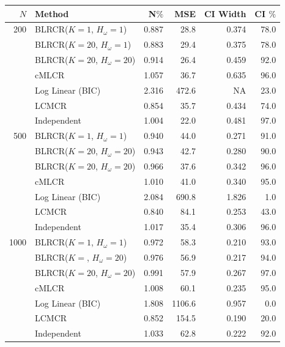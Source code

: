 \documentclass[
  12pt,
]{article}
\begin{document}
\begin{table}[H]
\centering
\begin{tabular}{||r l r r r r||} 
 \hline
$N$ & Method & N$\%$ &MSE & CI Width & CI $\%$   \\ [0.5ex] 
 \hline\hline
 200    & BLRCR($K=1$, $H_\omega=1$)  & 0.887   & 28.8   & 0.374   & 78.0 \\ 
               & BLRCR($K=20$, $H_\omega=1$)    & 0.883     & 29.4     & 0.375     & 78.0 \\ 
               & BLRCR($K=20$, $H_\omega=20$)    & 0.914     & 26.4     & 0.459     & 92.0 \\  
               & cMLCR       & 1.057       & 36.7      & 0.635      & 96.0 \\
               & Log Linear (BIC)  & 2.316      & 472.6     & NA     & 23.0 \\ 
               & LCMCR       & 0.854       & 35.7      & 0.434      & 74.0 \\ 
               & Independent & 1.004 & 22.0& 0.481& 97.0 \\ 

\hline
500    & BLRCR($K=1$, $H_\omega=1$)  & 0.940   & 44.0   & 0.271   & 91.0 \\ 
               & BLRCR($K=20$, $H_\omega=20$)    & 0.943     & 42.7     & 0.280     & 90.0 \\ 
               & BLRCR($K=20$, $H_\omega=20$)    & 0.966     & 37.6     & 0.342     & 96.0 \\  
               & cMLCR       & 1.010       & 41.0      & 0.340      & 95.0 \\
               & Log Linear (BIC)  & 2.084      & 690.8     & 1.826     & 1.0 \\ 
               & LCMCR       & 0.840       & 84.1      & 0.253      & 43.0 \\ 
               & Independent & 1.017 & 35.4& 0.306& 96.0 \\ 



\hline
1000    & BLRCR($K=1$, $H_\omega=1$)  & 0.972   & 58.3   & 0.210   & 93.0 \\ 
               & BLRCR($K=$, $H_\omega=20$)    & 0.976     & 56.9     & 0.217     & 94.0 \\ 
               & BLRCR($K=20$, $H_\omega=20$)    & 0.991     & 57.9     & 0.267     & 97.0 \\  
               & cMLCR       & 1.008       & 60.1      & 0.235      & 95.0 \\
               & Log Linear (BIC)  & 1.808      & 1106.6     & 0.957     & 0.0 \\ 
               & LCMCR       & 0.852       & 154.5      & 0.190      & 20.0 \\ 
               & Independent & 1.033 & 62.8& 0.222& 92.0 \\ 



\end{tabular}
\end{table}
\end{document}
